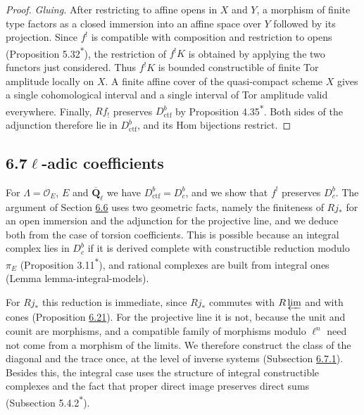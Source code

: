 \documentclass[11pt]{article}
\newcommand{\bpout}[1]{#1\textsuperscript{\hyperlink{bp-outside}{\ensuremath{\ast}}}}
\providecommand{\Dbc}{}\renewcommand{\Dbc}{D^b_c}
\begin{document}
\begin{proof}[{Proof}]
\emph{Gluing.} After restricting to affine opens in \(X\) and \(Y\), a morphism of finite type factors as a closed immersion into an affine space over \(Y\) followed by its projection. Since \(f^!\) is compatible with composition and restriction to opens (Proposition \bpout{5.32}), the restriction of \(f^!K\) is obtained by applying the two functors just considered. Thus \(f^!K\) is bounded constructible of finite Tor amplitude locally on \(X\). A finite affine cover of the quasi-compact scheme \(X\) gives a single cohomological interval and a single interval of Tor amplitude valid everywhere. Finally, \(Rf_!\) preserves \(D^b_{\mathrm{ctf}}\) by Proposition \bpout{4.35}. Both sides of the adjunction therefore lie in \(D^b_{\mathrm{ctf}}\), and its Hom bijections restrict.
\end{proof}


\subsection*{\texorpdfstring{6.7\quad $\ell$-adic coefficients}{6.7 ell-adic coefficients}}
\label{bp63}%
\label{bp64}%
For \(\Lambda=\mathcal O_E\), \(E\) and \(\overline{\mathbf Q}_\ell\) we have \(D^b_{\mathrm{ctf}}=\Dbc\), and we show that \(f^!\) preserves \(\Dbc\). The argument of Section \hyperref[bp56]{6.6} uses two geometric facts, namely the finiteness of \(Rj_*\) for an open immersion and the adjunction for the projective line, and we deduce both from the case of torsion coefficients. This is possible because an integral complex lies in \(\Dbc\) if it is derived complete with constructible reduction modulo \(\pi_E\) (Proposition \bpout{3.11}), and rational complexes are built from integral ones (Lemma lemma-integral-models).

For \(Rj_*\) this reduction is immediate, since \(Rj_*\) commutes with \(R\varprojlim\) and with cones (Proposition \hyperref[bp65]{6.21}). For the projective line it is not, because the unit and counit are morphisms, and a compatible family of morphisms modulo \(\ell^n\) need not come from a morphism of the limits. We therefore construct the class of the diagonal and the trace once, at the level of inverse systems (Subsection \hyperref[bp67]{6.7.1}). Besides this, the integral case uses the structure of integral constructible complexes and the fact that proper direct image preserves direct sums (Subsection \bpout{5.4.2}).
\end{document}
